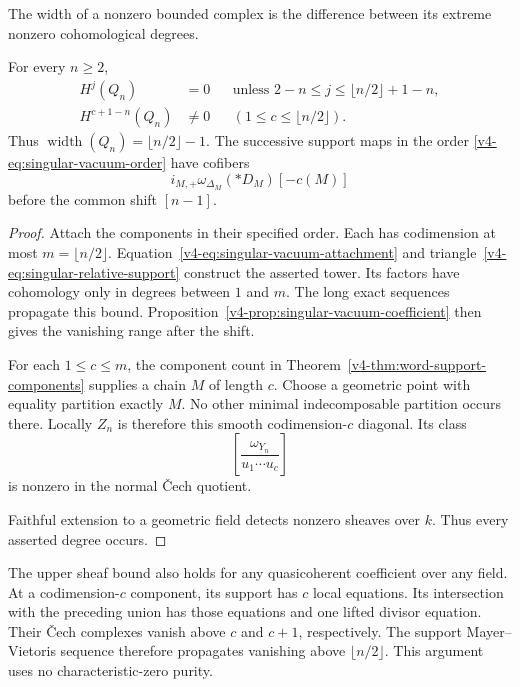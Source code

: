 The width of a nonzero bounded complex
is the difference between its extreme
nonzero cohomological degrees.

\begin{theorem}\label{v4-thm:singular-vacuum-width}
For every \(n\geq2\),
\[
 \begin{aligned}
 H^j(Q_n)&=0
       &&\text{unless }2-n\leq j\leq\lfloor n/2\rfloor+1-n,\\
 H^{c+1-n}(Q_n)&\ne0
       &&(1\leq c\leq\lfloor n/2\rfloor).
 \end{aligned}
\]
Thus \(\operatorname{width}(Q_n)=\lfloor n/2\rfloor-1\).
The successive support maps in the order
\eqref{v4-eq:singular-vacuum-order} have cofibers
\[
                     i_{M,+}\omega_{\Delta_M}(*D_M)[-c(M)]
\]
before the common shift \([n-1]\).
\end{theorem}

\begin{proof}
Attach the components in their specified order.
Each has codimension at most
\(m=\lfloor n/2\rfloor\).
Equation~\eqref{v4-eq:singular-vacuum-attachment}
and triangle~\eqref{v4-eq:singular-relative-support}
construct the asserted tower.
Its factors have cohomology only in
degrees between \(1\) and \(m\).
The long exact sequences propagate this bound.
Proposition~\ref{v4-prop:singular-vacuum-coefficient}
then gives the vanishing range after the shift.

For each \(1\leq c\leq m\), the component
count in Theorem~\ref{v4-thm:word-support-components}
supplies a chain \(M\) of length \(c\).
Choose a geometric point with equality
partition exactly \(M\).
No other minimal indecomposable partition
occurs there. Locally \(Z_n\) is therefore
this smooth codimension-\(c\) diagonal.
Its class
\[
                      \left[\frac{\omega_{Y_n}}{u_1\cdots u_c}\right]
\]
is nonzero in the normal Čech quotient.

Faithful extension to a geometric field
detects nonzero sheaves over \(k\).
Thus every asserted degree occurs.
\end{proof}

The upper sheaf bound also holds for
any quasicoherent coefficient over any field.
At a codimension-\(c\) component, its support
has \(c\) local equations.
Its intersection with the preceding union
has those equations and one lifted divisor
equation. Their Čech complexes vanish
above \(c\) and \(c+1\), respectively.
The support Mayer--Vietoris sequence therefore
propagates vanishing above \(\lfloor n/2\rfloor\).
This argument uses no characteristic-zero purity.

